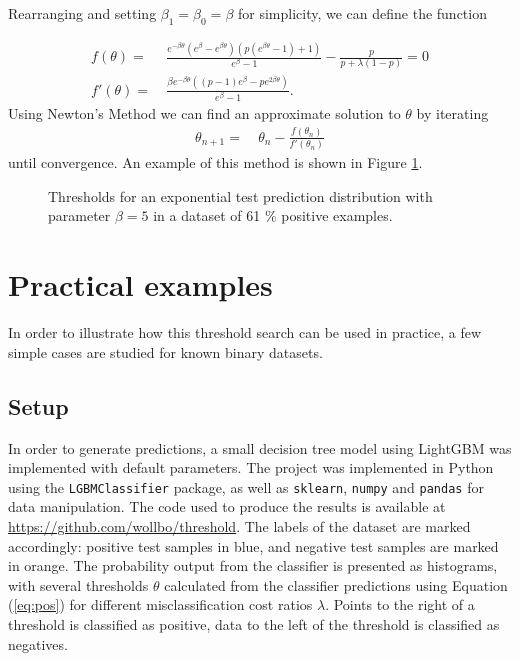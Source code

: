 \documentclass{article}
\begin{document}
Rearranging and setting $\beta_1 = \beta_0 = \beta$ for simplicity, we can define the function

\begin{align}
    f(\theta) =& \ \frac{e^{-\beta \theta} (e^\beta-e^{\beta \theta}) (p(e^{\beta \theta}-1) + 1)}{e^{\beta}-1} - \frac{p}{p+\lambda(1-p)} = 0 \\
    f'(\theta) =& \ \frac{\beta e^{-\beta \theta} ((p-1) e^\beta - p e^{2\beta \theta})}{e^{\beta}-1}\text{.}
\end{align}
Using Newton's Method we can find an approximate solution to $\theta$ by iterating
\begin{align}
    \theta_{n+1} =& \ \theta_n - \frac{f(\theta_n)}{f'(\theta_n)}
\end{align}
until convergence. An example of this method is shown in Figure \ref{fig:exp5}.
\begin{figure}
    \centering
    \scalebox{.8}{}
    \caption{Thresholds for an exponential test prediction distribution with parameter $\beta = 5$ in a dataset of 61 \% positive examples.}
    \label{fig:exp5}
\end{figure}
\section{Practical examples}
In order to illustrate how this threshold search can be used in practice, a few simple cases are studied for known binary datasets.
\subsection{Setup}
In order to generate predictions, a small decision tree model using LightGBM was implemented with default parameters. The project was implemented in Python using the \texttt{LGBMClassifier} package, as well as \texttt{sklearn}, \texttt{numpy} and \texttt{pandas} for data manipulation. The code used to produce the results is available at \url{https://github.com/wollbo/threshold}. The labels of the dataset are marked accordingly: positive test samples in blue, and negative test samples are marked in orange. The probability output from the classifier is presented as histograms, with several thresholds $\theta$ calculated from the classifier predictions using Equation (\ref{eq:pos}) for different misclassification cost ratios $\lambda$. Points to the right of a threshold is classified as positive, data to the left of the threshold is classified as negatives.
\end{document}
